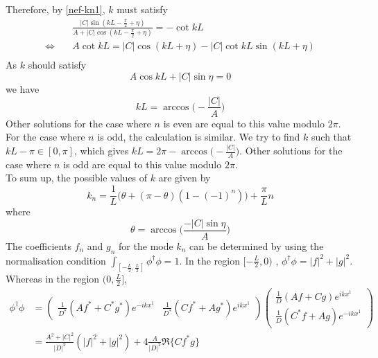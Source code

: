 Therefore, by \cref{nef-kn1}, $k$ must satisfy
\begin{equation}\label{nef-arctan}
\begin{split}
& \frac{|C| \sin(kL - \frac{\pi}{2} + \eta)}{A + | C| \cos(kL - \frac{\pi}{2} + \eta) } =  - \cot kL  \\
\Leftrightarrow \quad & A \cot kL = |C| \cos(kL + \eta) - |C| \cot kL \sin(kL + \eta)  \\
\end{split}
\end{equation}
As $k$ should satisfy  
\begin{equation}
A \cos kL + |C| \sin\eta= 0
\end{equation}
we have
\begin{equation*}
kL = \arccos \big(-\frac{|C|}{A}\big)
\end{equation*}
Other solutions for the case where $n$ is even are equal to this value modulo $2 \pi$. \\
For the case where $n$ is odd, the calculation is similar.
We try to find $k$ such that $kL - \pi \in [0, \pi]$, which gives $kL = 2\pi - \arccos \big(-\frac{|C|}{A}\big)$. 
Other solutions for the case where $n$ is odd are equal to this value modulo $2 \pi$.\\
To sum up, the possible values of $k$ are given by
\begin{equation*}
k_{n} = \frac{1}{L} \big(\theta + (\pi - \theta)(1- (-1)^n)\big) + \frac{\pi}{L}n 
\end{equation*}
where
\begin{equation*}
\theta = \arccos\bigg( \frac{-|C| \sin \eta}{A} \bigg)
\end{equation*}
The coefficients $f_{n}$ and $g_{n}$ for the mode $k_{ n}$ can be determined by using the normalisation condition  $\int_{[-\frac{L}{2}, \frac{L}{2}]}\phi^\dagger \phi = 1$. 
In the region $[-\frac{L}{2}, 0)$ , $\phi^\dagger \phi = | f |^2 + | g |^2$. Whereas in the region $(0, \frac{L}{2}]$, 
\begin{equation}\label{nef-norm1}
\begin{split}
\phi^\dagger \phi & = \begin{pmatrix}
\frac{1}{D^*}(Af^* +  C^*g^*)e^{-ikx^1}  & \frac{1}{D^*}(C f^* + Ag^*)e^{ikx^1} 
\end{pmatrix}\begin{pmatrix}
\frac{1}{D}(Af +  Cg)e^{ikx^1}  \\
 \frac{1}{D}(C^* f + Ag)e^{-ikx^1} 
\end{pmatrix}  \\
 & =
\frac{A^2 + | C|^2}{| D |^2}(|f|^2 + |g|^2) + 4\frac{A}{|D|^2}\Re \{C f^* g\}
\end{split}
\end{equation}
